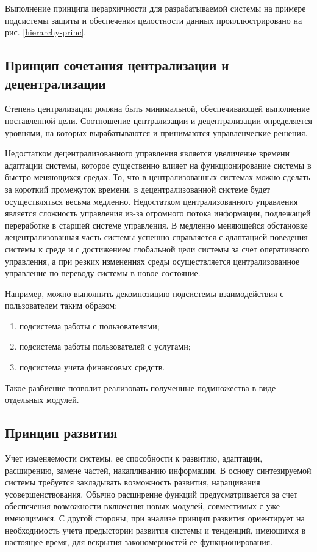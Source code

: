 Выполнение принципа иерархичности для разрабатываемой системы на примере подсистемы защиты и обеспечения целостности данных проиллюстрировано на рис. \ref{hierarchy-princ}.

\subsection{Принцип сочетания централизации и децентрализации}

Степень централизации должна быть минимальной, обеспечивающей выполнение поставленной цели.
Соотношение централизации и децентрализации определяется уровнями, на которых вырабатываются и принимаются управленческие решения.

Недостатком децентрализованного управления является увеличение времени адаптации системы, которое существенно влияет на функционирование системы в быстро меняющихся средах.
То, что в централизованных системах можно сделать за короткий промежуток времени, в децентрализованной системе будет осуществляться весьма медленно.
Недостатком централизованного управления является сложность управления из-за огромного потока информации, подлежащей переработке в старшей системе управления.
В медленно меняющейся обстановке децентрализованная часть системы успешно справляется с адаптацией поведения системы к среде и с достижением глобальной цели системы за счет оперативного управления, а при резких изменениях среды осуществляется централизованное управление по переводу системы в новое состояние.

Например, можно выполнить декомпозицию подсистемы взаимодействия с пользователем таким образом:
\begin{enumerate}
  \item подсистема работы с пользователями;
  \item подсистема работы пользователей с услугами;
  \item подсистема учета финансовых средств.
\end{enumerate}

Такое разбиение позволит реализовать полученные подмножества в виде отдельных модулей.

\subsection{Принцип развития}

Учет изменяемости системы, ее способности к развитию, адаптации, расширению, замене частей, накапливанию информации.
В основу синтезируемой системы требуется закладывать возможность развития, наращивания усовершенствования.
Обычно расширение функций предусматривается за счет обеспечения возможности включения новых модулей, совместимых с уже имеющимися.
С другой стороны, при анализе принцип развития ориентирует на необходимость учета предыстории развития системы и тенденций, имеющихся в настоящее время, для вскрытия закономерностей ее функционирования.

